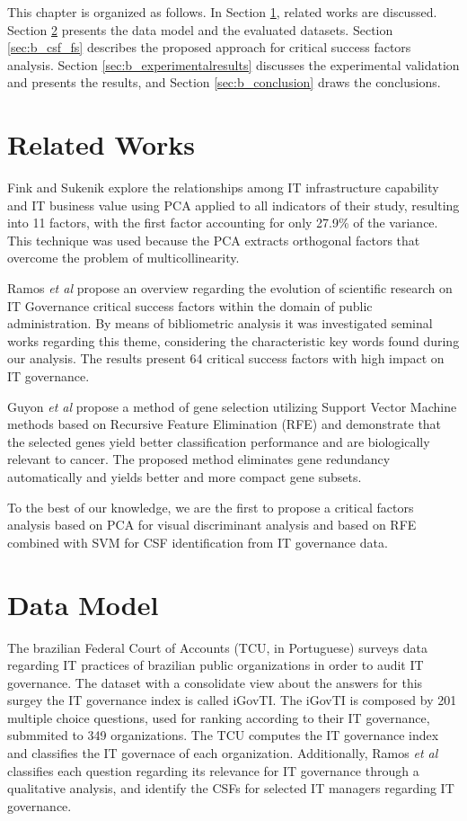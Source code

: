 This chapter is organized as follows. In Section \ref{sec:b_relatedworks}, related works are discussed. Section \ref{sec:b_datamodel} presents the data model and the evaluated datasets. Section \ref{sec:b_csf_fs} describes the proposed approach for critical success factors analysis. Section \ref{sec:b_experimentalresults} discusses the experimental validation and presents the results, and Section \ref{sec:b_conclusion} draws the conclusions.


\section{Related Works}
\label{sec:b_relatedworks}

Fink and Sukenik \cite{fink2011effect} explore the relationships among IT infrastructure capability and IT business value using PCA applied to all indicators of their study, resulting into 11 factors, with the first factor accounting for only 27.9\% of the variance. This technique was used because the PCA extracts orthogonal factors that overcome the problem of multicollinearity.

Ramos \emph{et al} \cite{ramos2016information} propose an overview regarding the evolution of scientific research on IT Governance critical success factors within the domain of public administration. By means of bibliometric analysis it was investigated seminal works regarding this theme, considering the characteristic key words found during our analysis. The results present 64 critical success factors with high impact on IT governance.

Guyon \emph{et al} \cite{guyon2002gene} propose a method of gene selection utilizing Support Vector Machine methods based on Recursive Feature Elimination (RFE) and demonstrate that the selected genes yield better classification performance and are biologically relevant to cancer.  The proposed method eliminates gene redundancy automatically and yields better and more compact gene subsets. 

To the best of our knowledge, we are the first to propose a critical factors analysis based on PCA for visual discriminant analysis and based on RFE combined with SVM for CSF identification from IT governance data.


\section{Data Model}
\label{sec:b_datamodel}

The brazilian Federal Court of Accounts (TCU, in Portuguese) surveys data regarding IT practices of brazilian public organizations in order to audit IT governance. The dataset with a consolidate view about the answers for this surgey the IT governance index is called iGovTI. The iGovTI is composed by 201 multiple choice questions, used for ranking according to their IT governance, submmited to 349 organizations. The TCU computes the IT governance index and classifies the IT governace of each organization. Additionally, Ramos \emph{et al} \cite{ramos2016information} classifies each question regarding its relevance for IT governance through a qualitative analysis, and identify the CSFs for selected IT managers regarding IT governance.


